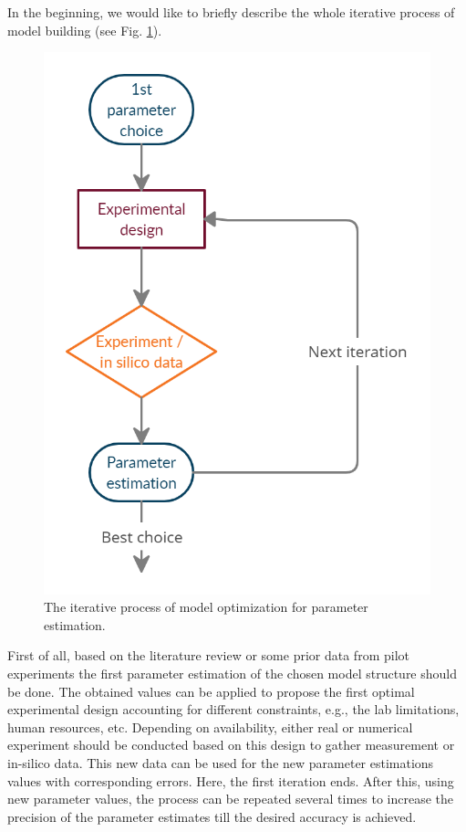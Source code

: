 \documentclass[10pt,A4paper]{article}
\begin{document}
In the beginning, we would like to briefly describe the whole iterative process of model building (see Fig. \ref{fig:expdesign_scheme}).
\begin{figure}[H]
    \centering
    \includegraphics[scale=0.3]{Figures/scheme.png}
    \caption{The iterative process of model optimization for parameter estimation.}
    \label{fig:expdesign_scheme}
\end{figure}
First of all, based on the literature review or some prior data from pilot experiments  the first parameter estimation of the chosen model structure should be done.
The obtained values can be applied to propose the first optimal experimental design accounting for different constraints, e.g., the lab limitations, human resources, etc. 
Depending on availability, either real or numerical experiment should be conducted based on this design to gather measurement or in-silico data. 
This new data can be used for the new parameter estimations values with corresponding errors.
Here, the first iteration ends. 
After this, using new parameter values, the process can be repeated several times to increase the precision of the parameter estimates till the desired accuracy is achieved.
\end{document}
